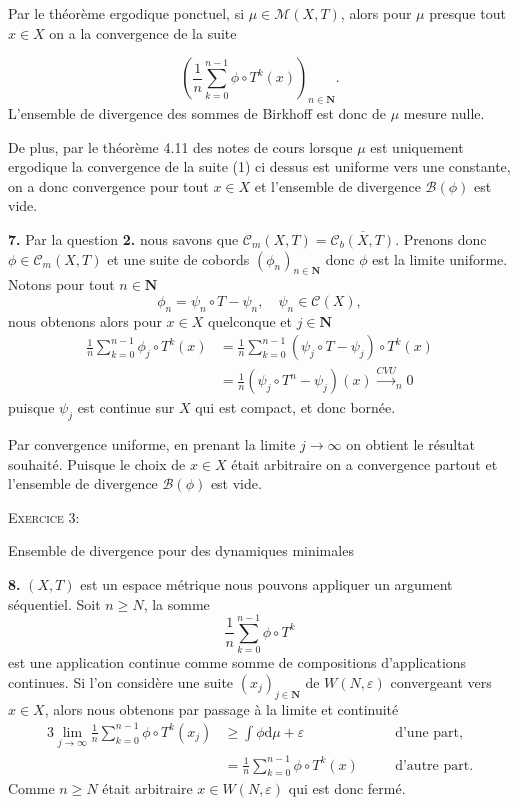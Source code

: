 \documentclass[12pt]{article}
\newenvironment{ex}[1]
{\begin{mdframed}[linewidth=0.6pt]
        \textsc{Exercice #1:}

}
    {\end{mdframed}}
\newcommand{\N}{\mathbf{N}}
\newcommand{\de}{\mathrm{d}}
\begin{document}
\medskip

Par le théorème ergodique ponctuel, si $\mu \in \mathcal{M}(X,T)$, alors pour $\mu$ presque tout  $x \in X$ on a la convergence de la suite 

\begin{equation}
        (\frac{1}{n}\sum_{k=0}^{n-1} \phi\circ T^{k}(x))_{n\in\N}.
\end{equation}
L'ensemble de divergence des sommes de Birkhoff est donc de $\mu$ mesure nulle. 

\medskip

De plus, par le théorème 4.11 des notes de cours lorsque $\mu$ est uniquement ergodique la convergence de la suite (1) ci dessus est uniforme vers une constante, on a donc convergence pour tout  $x \in X$ et l'ensemble de divergence $\mathcal{B}(\phi)$ est vide.

\bigskip

\textbf{7.} Par la question \textbf{2.} nous savons que $\mathcal{C}_{m}(X,T) = \overline{\mathcal{C}_{b}(X,T)}$. Prenons donc $\phi \in \mathcal{C}_{m}(X,T)$ et une suite de cobords $(\phi_{n})_{n\in\N}$ donc $\phi$ est la limite uniforme. Notons pour tout $n \in \N$ \[
        \phi_{n} = \psi_{n}\circ T - \psi_{n}, \quad \psi_{n} \in \mathcal{C}(X)
,\] nous obtenons alors pour $x \in X$ quelconque et $j\in\N$
\begin{align*}
        \frac{1}{n}\sum_{k=0}^{n-1} \phi_{j}\circ T^{k}(x) &= \frac{1}{n}\sum_{k=0}^{n-1} (\psi_{j}\circ T - \psi_{j})\circ T^{k}(x) \\
                                                            &= \frac{1}{n}(\psi_{j}\circ T^{n}-\psi_{j})(x) \overset{CVU}{\longrightarrow}_{n} 0
\end{align*} puisque $\psi_{j}$ est continue sur $X$ qui est compact, et donc bornée.

Par convergence uniforme, en prenant la limite $j \to \infty$ on obtient le résultat souhaité. Puisque le choix de $x \in X$ était arbitraire on a convergence partout et l'ensemble de divergence $\mathcal{B}(\phi)$ est vide.

\bigskip

\begin{ex}{3}
        Ensemble de divergence pour des dynamiques minimales 
\end{ex}

\textbf{8.} $(X,T)$ est un espace métrique nous pouvons appliquer un argument séquentiel. Soit $n \ge N$, la somme \[
\frac{1}{n}\sum_{k=0}^{n-1} \phi\circ T^{k}
\] est une application continue comme somme de compositions d'applications continues. Si l'on considère une suite $(x_{j})_{j\in\N}$ de $W(N, \varepsilon)$ convergeant vers $x \in X$, alors nous obtenons par passage à la limite et continuité 
\begin{alignat*}{3}
        \lim_{j\to \infty}\frac{1}{n}\sum_{k=0}^{n-1} \phi\circ T^{k}(x_{j}) &\ge \int\phi\de\mu + \varepsilon \quad &&\text{d'une part,} \\
                                                                             &= \frac{1}{n}\sum_{k=0}^{n-1} \phi\circ T^{k}(x) \quad &&\text{d'autre part}
.\end{alignat*}
Comme $n \ge N$ était arbitraire $x \in W(N,\varepsilon)$ qui est donc fermé.
\end{document}
